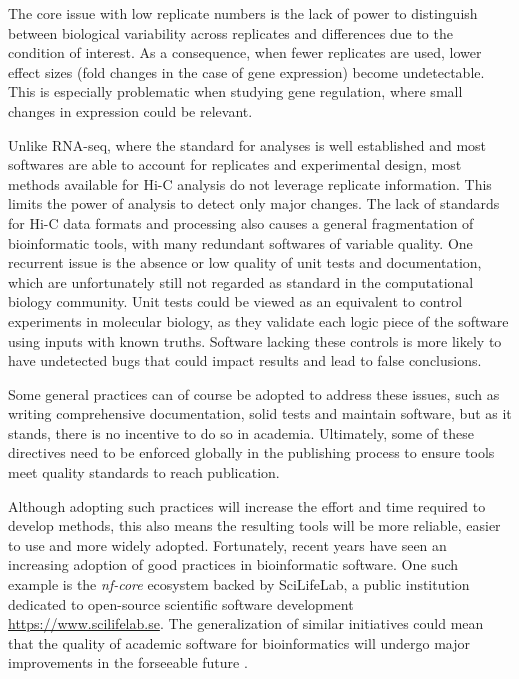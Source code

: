 The core issue with low replicate numbers is the lack of power to distinguish between biological variability across replicates and differences due to the condition of interest. As a consequence, when fewer replicates are used, lower effect sizes (fold changes in the case of gene expression) become undetectable. This is especially problematic when studying gene regulation, where small changes in expression could be relevant.


Unlike RNA-seq, where the standard for analyses is well established and most softwares are able to account for replicates and experimental design, most methods available for Hi-C analysis do not leverage replicate information. This limits the power of analysis to detect only major changes. The lack of standards for Hi-C data formats and processing also causes a general fragmentation of bioinformatic tools, with many redundant softwares of variable quality. One recurrent issue is the absence or low quality of unit tests and documentation, which are unfortunately still not regarded as standard in the computational biology community. Unit tests could be viewed as an equivalent to control experiments in molecular biology, as they validate each logic piece of the software using inputs with known truths. Software lacking these controls is more likely to have undetected bugs that could impact results and lead to false conclusions.

Some general practices can of course be adopted to address these issues, such as writing comprehensive documentation, solid tests and maintain software, but as it stands, there is no incentive to do so in academia. Ultimately, some of these directives need to be enforced globally in the publishing process to ensure tools meet quality standards to reach publication.

Although adopting such practices will increase the effort and time required to develop methods, this also means the resulting tools will be more reliable, easier to use and more widely adopted. Fortunately, recent years have seen an increasing adoption of good practices in bioinformatic software. One such example is the \textit{nf-core} ecosystem backed by SciLifeLab, a public institution dedicated to open-source scientific software development \url{https://www.scilifelab.se}. The generalization of similar initiatives could mean that the quality of academic software for bioinformatics will undergo major improvements in the forseeable future \cite{ewelsNfcoreFrameworkCommunitycurated2020}.